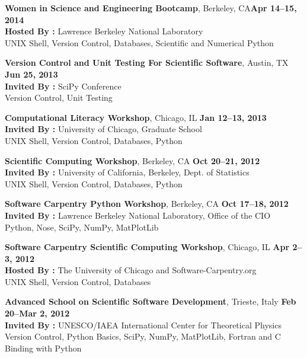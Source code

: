 \documentclass[margin,line]{resume}
\begin{document}
\begin{resume}
    \textbf{Women in Science and Engineering Bootcamp}, Berkeley, CA\hfill \textbf{Apr 14--15, 2014}\\
               \textbf{Hosted By : } Lawrence Berkeley National Laboratory\\
               UNIX Shell, Version Control, Databases, Scientific and Numerical Python

    \textbf{Version Control and Unit Testing For Scientific Software}, Austin, TX \hfill \textbf{Jun 25, 2013}\\
               \textbf{Invited By : } SciPy Conference\\
               Version Control, Unit Testing

    \textbf{Computational Literacy Workshop}, Chicago, IL \hfill \textbf{Jan 12--13, 2013}\\
               \textbf{Invited By : } University of Chicago, Graduate School\\
               UNIX Shell, Version Control, Databases, Python

    \textbf{Scientific Computing Workshop}, Berkeley, CA \hfill \textbf{Oct 20--21, 2012}\\
               \textbf{Invited By : } University of California, Berkeley, Dept. of Statistics\\
               UNIX Shell, Version Control, Databases, Python

    \textbf{Software Carpentry Python Workshop}, Berkeley, CA \hfill \textbf{Oct 17--18, 2012}\\
               \textbf{Invited By : } Lawrence Berkeley National Laboratory, Office of the CIO\\
               Python, Nose, SciPy, NumPy, MatPlotLib

    \textbf{Software Carpentry Scientific Computing Workshop}, Chicago, IL \hfill \textbf{Apr 2--3, 2012}\\
               \textbf{Hosted By : } The University of Chicago and Software-Carpentry.org \\
               UNIX Shell, Version Control, Databases

    \textbf{Advanced School on Scientific Software Development}, Trieste, Italy \hfill \textbf{Feb 20--Mar 2, 2012}\\
               \textbf{Invited By : } UNESCO/IAEA International Center for Theoretical Physics\\
               Version Control, Python Basics, SciPy, NumPy, MatPlotLib, Fortran and C Binding with Python


\end{resume}
\end{document}
